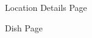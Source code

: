 \documentclass[5pt]{article} %
\begin{document}
\begin{figure}[h!]
\centering
{}
\caption{Location Details Page}
\end{figure}

\begin{figure}[h!]
\centering
{}
\caption{Dish Page}
\end{figure}
\end{document}
